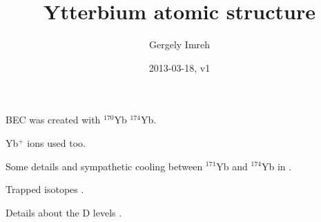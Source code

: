 \documentclass[12pt,a4paper]{article}
\author{Gergely Imreh}
\title{Ytterbium atomic structure}
\date{2013-03-18, v1}
\begin{document}
\maketitle


BEC was created with $^{170}$Yb\cite{Fukuhara2007} $^{174}$Yb\cite{Takasu2003}.

Yb$^+$ ions used too\cite{Lehmitz1989}.

Some details and sympathetic cooling between $^{171}$Yb and $^{174}$Yb in \cite{Honda2002}.

Trapped isotopes \cite{Kuwamoto1999}.


Details about the D levels \cite{DeMille1995}.



\end{document}
